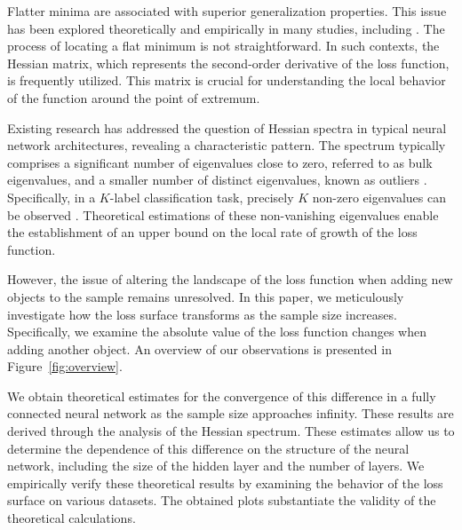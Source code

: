 \documentclass{article}
\begin{document}
Flatter minima are associated with superior generalization properties. This issue has been explored theoretically and empirically in many studies, including \cite{NIPS1994_01882513, neyshabur2017exploringgeneralizationdeeplearning, dinh2017sharpminimageneralizedeep, fort2019emergentpropertieslocalgeometry}. The process of locating a flat minimum is not straightforward. In such contexts, the Hessian matrix, which represents the second-order derivative of the loss function, is frequently utilized. This matrix is crucial for understanding the local behavior of the function around the point of extremum.

Existing research \cite{pmlr-v97-ghorbani19b, sagun2018empiricalanalysishessianoverparametrized, papyan2019spectrumdeepnethessiansscale, liao2021hessianeigenspectrarealisticnonlinear, dauphin2024neglectedhessiancomponentexplains, papyan2020tracesclasscrossclassstructurepervade, papyan2019measurementsthreelevelhierarchicalstructure, garrod2024unifyinglowdimensionalobservations} has addressed the question of Hessian spectra in typical neural network architectures, revealing a characteristic pattern. The spectrum typically comprises a significant number of eigenvalues close to zero, referred to as bulk eigenvalues, and a smaller number of distinct eigenvalues, known as outliers \cite{pmlr-v97-ghorbani19b}. Specifically, in a $K$-label classification task, precisely $K$ non-zero eigenvalues can be observed \cite{sagun2018empiricalanalysishessianoverparametrized, papyan2019spectrumdeepnethessiansscale}. Theoretical estimations of these non-vanishing eigenvalues enable the establishment of an upper bound on the local rate of growth of the loss function.

However, the issue of altering the landscape of the loss function when adding new objects to the sample remains unresolved. In this paper, we meticulously investigate how the loss surface transforms as the sample size increases. Specifically, we examine the absolute value of the loss function changes when adding another object. An overview of our observations is presented in Figure~\ref{fig:overview}.

We obtain theoretical estimates for the convergence of this difference in a fully connected neural network as the sample size approaches infinity. These results are derived through the analysis of the Hessian spectrum. These estimates allow us to determine the dependence of this difference on the structure of the neural network, including the size of the hidden layer and the number of layers. We empirically verify these theoretical results by examining the behavior of the loss surface on various datasets. The obtained plots substantiate the validity of the theoretical calculations.
\end{document}
